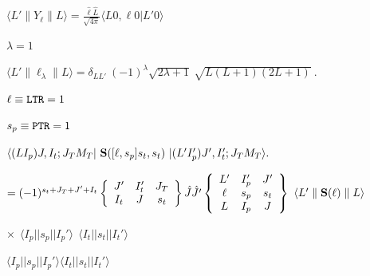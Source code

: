 \documentclass[11pt]{article}
\def\lthtmlcheckvsize{\ifdim\ht\sizebox<\vsize 
  \ifdim\wd\sizebox<\hsize\expandafter\hfill\fi \expandafter\vfill
  \else\expandafter\vss\fi}%
\begin{document}
{\newpage\clearpage
{}%
$\displaystyle \langle L' \parallel Y_\ell  \parallel L \rangle =
\frac{\hat{\ell}\hat{L}}{\sqrt{4\pi}}  \langle L 0, \ell 0 | L' 0 \rangle$%
\lthtmlindisplaymathZ
\lthtmlcheckvsize\clearpage}

{\newpage\clearpage
{}%
$\lambda=1$%
\lthtmlindisplaymathZ
\lthtmlcheckvsize\clearpage}

{\newpage\clearpage
{}%
$\displaystyle \langle L' \parallel  \ell_\lambda  \parallel L \rangle = \delta_{LL'} ~ (-1)^\lambda \sqrt{2\lambda+1} ~ \sqrt{ L  (L+1) (2L+1) }  \ .$%
\lthtmlindisplaymathZ
\lthtmlcheckvsize\clearpage}

{\newpage\clearpage
{}%
$\ell \equiv {\tt LTR} = 1$%
\lthtmlindisplaymathZ
\lthtmlcheckvsize\clearpage}

{\newpage\clearpage
{}%
$s_p \equiv {\tt PTR} = 1$%
\lthtmlindisplaymathZ
\lthtmlcheckvsize\clearpage}

{\newpage\clearpage
{}%
$\textstyle \langle(LI_p)J,I_t;J_TM_T | ~{\bf S}([\ell,s_p]s_t,s_t) ~| (L'I_p')J',I_t';J_TM_T \rangle.
\hspace{4cm}$%
\lthtmlindisplaymathZ
\lthtmlcheckvsize\clearpage}

{\newpage\clearpage
{}%
$\textstyle =  (-1)^{s_t+J_T+J'+I_t}
\left\{ \begin{array}{ccc}
J'  & I_t' & J_T \\
I_t & J    & s_t \\
\end{array} \right\}   \hat{J} \hat{J'}
\left\{ \begin{array}{ccc}
L' & I_p' & J'  \\
\ell & s_p & s_t  \\
L & I_p & J  \\
\end{array} \right\}  ~   \langle L' \parallel {\bf S}(\ell)  \parallel L \rangle$%
\lthtmlindisplaymathZ
\lthtmlcheckvsize\clearpage}

{\newpage\clearpage
{}%
$\textstyle \times ~~
\langle I_p||s_p||I_p'\rangle ~~ \langle I_t||s_t||I_t'\rangle$%
\lthtmlindisplaymathZ
\lthtmlcheckvsize\clearpage}

{\newpage\clearpage
{}%
$\langle I_p||s_p||I_p'\rangle \langle I_t||s_t||I_t'\rangle$%
\lthtmlindisplaymathZ
\lthtmlcheckvsize\clearpage}
\end{document}
